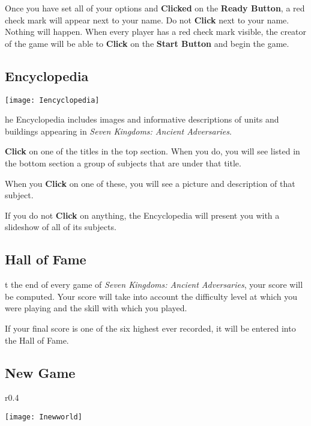 Once you have set all of your options and \textbf{Clicked} on the \textbf{Ready Button}, a red check mark will appear next to your name. Do not \textbf{Click} next to your name. Nothing will happen. When every player has a red check mark visible, the creator of the game will be able to \textbf{Click} on the \textbf{Start Button} and begin the game.

\subsection{Encyclopedia}


\begin{center}
    \texttt{[image: Iencyclopedia]} %
\end{center}

he Encyclopedia includes images and informative descriptions of units and buildings appearing in \textit{Seven Kingdoms: Ancient Adversaries}.

\textbf{Click} on one of the titles in the top section. When you do, you will see listed in the bottom section a group of subjects that are under that title.

When you \textbf{Click} on one of these, you will see a picture and description of that subject.

If you do not \textbf{Click} on anything, the Encyclopedia will present you with a slideshow of all of its subjects.

\subsection{Hall of Fame}



t the end of every game of \textit{Seven Kingdoms: Ancient Adversaries}, your score will be computed. Your score will take into account the difficulty level at which you were playing and the skill with which you played.

If your final score is one of the six highest ever recorded, it will be entered into the Hall of Fame.

\subsection{New Game}

\begin{wrapfigure}{r}{0.4\textwidth}
    \begin{center}
        \vspace{-20pt}
        \texttt{[image: Inewworld]} %
    \end{center}
\vspace{-20pt}
\end{wrapfigure}

